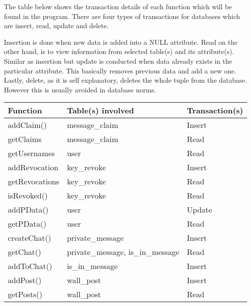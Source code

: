 The table below shows the transaction details of each function which will be 
found in the program. There are four types of transactions for databases which 
are insert, read, update and delete. 

Insertion is done when new data is added into a NULL attribute. Read on the 
other hand, is to view information from selected table(s) and its attribute(s).
Similar as insertion but update is conducted when data already exists in the 
particular attribute. This basically removes previous data and add a new one.
Lastly, delete, as it is self explanatory, deletes the whole tuple from the 
database. However this is usually avoided in database norms.

\begin{center}
    \begin{tabular}{ | p{3cm} | p{5cm} | p{3cm} |}
    \hline
    {\bf Function}        & {\bf Table(s) involved} & {\bf Transaction(s)} \\ \hline
    addClaim()      & message\_claim    & Insert         \\ \hline 
    getClaims       & message\_claim    & Read           \\ \hline 
    getUsernames    & user              & Read           \\ \hline 
    addRevocation   & key\_revoke       & Insert         \\ \hline 
    getRevocations  & key\_revoke       & Read           \\ \hline 
    isRevoked()     & key\_revoke       & Read           \\ \hline 
    addPData()      & user              & Update         \\ \hline 
    getPData()      & user              & Read           \\ \hline 
    createChat()    & private\_message  & Insert         \\ \hline 
    getChat()       & private\_message, is\_in\_message & Read\\ \hline 
    addToChat()     & is\_in\_message   & Insert         \\ \hline 
    addPost()       & wall\_post        & Insert         \\ \hline 
    getPosts()      & wall\_post        & Read           \\ \hline 
    \end{tabular}
\end{center}


